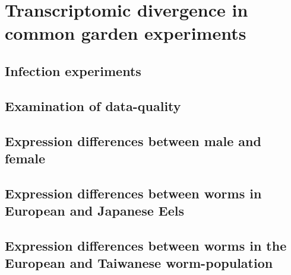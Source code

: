 
\chapter{Transcriptomic divergence in common garden experiments
} %
\label{cha:tra-diff}


\ifpdf
    \graphicspath{{X/figures/PNG/}{X/figures/PDF/}{X/figures/}}
\else
    \graphicspath{{X/figures/EPS/}{X/figures/}}
\fi



\section{Infection experiments}

\section{Examination of data-quality}

\section{Expression differences between male and female}

\section{Expression differences between worms in European and Japanese
  Eels}

\section{Expression differences between worms in the European and
  Taiwanese worm-population}



